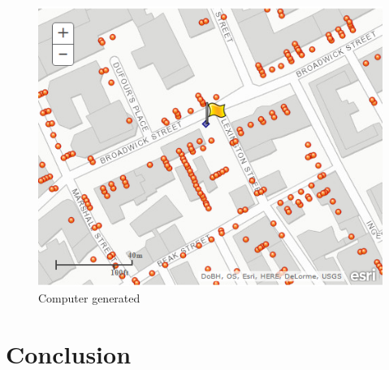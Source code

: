 \documentclass[12pt]{article}
\begin{document}
\begin{figure}
\centering
\includegraphics[scale=0.7]{gis_advanced}
\caption{Computer generated \cite{advanced}}
\label{fig:advanced}
\end{figure}


\section{Conclusion}



\end{document}
